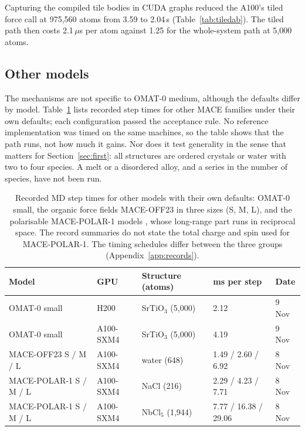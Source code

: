 \documentclass[11pt]{article}
\newcommand{\us}{\,\ensuremath{\mu}s}
\begin{document}
Capturing the compiled tile bodies in CUDA graphs reduced the A100's tiled force call at 975{,}560 atoms from
3.59 to 2.04\,s (Table~\ref{tab:tiledab}). The tiled path then costs 2.1\us{} per atom against 1.25 for the
whole-system path at 5{,}000 atoms.

\subsection{Other models}

The mechanisms are not specific to OMAT-0 medium, although the defaults differ by model. Table~\ref{tab:models}
lists recorded step times for other MACE families under their own defaults; each configuration passed the
acceptance rule. No reference implementation was timed on the same machines, so the table shows that the path
runs, not how much it gains. Nor does it test generality in the sense that matters for
Section~\ref{sec:first}: all structures are ordered crystals or water with two to four species. A melt or a
disordered alloy, and a series in the number of species, have not been run.

\begin{table}[t]
\centering
\small
\begin{tabular}{lllll}
\toprule
Model & GPU & Structure (atoms) & ms per step & Date \\
\midrule
OMAT-0 small                              & H200      & SrTiO$_3$ (5{,}000) & 2.12                 & 9 Nov \\
OMAT-0 small                              & A100-SXM4 & SrTiO$_3$ (5{,}000) & 4.19                 & 9 Nov \\
MACE-OFF23 S / M / L                      & A100-SXM4 & water (648)         & 1.49 / 2.60 / 6.92   & 8 Nov \\
MACE-POLAR-1 S / M / L                    & A100-SXM4 & NaCl (216)          & 2.29 / 4.23 / 7.71   & 8 Nov \\
MACE-POLAR-1 S / M / L                    & A100-SXM4 & NbCl$_5$ (1{,}944)  & 7.77 / 16.38 / 29.06 & 8 Nov \\
\bottomrule
\end{tabular}
\caption{Recorded MD step times for other models with their own defaults: OMAT-0 small, the organic force
fields MACE-OFF23 \cite{kovacs2025maceoff} in three sizes (S, M, L), and the polarisable MACE-POLAR-1 models
\cite{batatia2026macepolar}, whose long-range part runs in reciprocal space. The record summaries do not state
the total charge and spin used for MACE-POLAR-1. The timing schedules differ between the three groups
(Appendix~\ref{app:records}).}
\label{tab:models}
\end{table}
\end{document}
